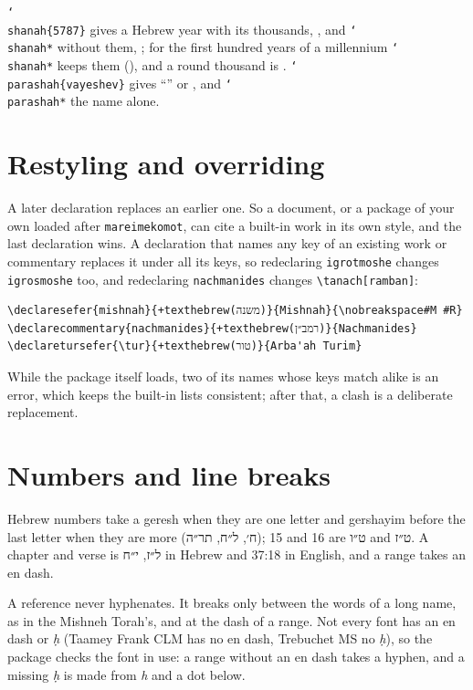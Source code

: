 \documentclass[11pt]{article}
\newcommand{\cs}[1]{\texttt{\char`\\#1}}
\begin{document}
\cs{shanah}\verb|{5787}| gives a Hebrew year with its thousands, \texthebrew{}, and
\cs{shanah*} without them, \texthebrew{}; for the first hundred years of a
millennium \cs{shanah*} keeps them (\texthebrew{}), and a round thousand is
\texthebrew{}. \cs{parashah}\verb|{vayeshev}| gives ``'' or
\texthebrew{}, and \cs{parashah*} the name alone.

\section{Restyling and overriding}

A later declaration replaces an earlier one. So a document, or a package of your own loaded
after \texttt{mareimekomot}, can cite a built-in work in its own style, and the last
declaration wins. A declaration that names any key of an existing work or commentary replaces
it under all its keys, so redeclaring \texttt{igrotmoshe} changes \texttt{igrosmoshe} too, and
redeclaring \texttt{nachmanides} changes \verb|\tanach[ramban]|:
\begin{Verbatim}[commandchars=+\(\)]
% "Mishnah Sukkah 4:1" rather than "M. Sukkah 4:1"
\declaresefer{mishnah}{+texthebrew(משנה)}{Mishnah}{\nobreakspace#M #R}
\declarecommentary{nachmanides}{+texthebrew(רמב״ן)}{Nachmanides}
\declaretursefer{\tur}{+texthebrew(טור)}{Arba'ah Turim}
\end{Verbatim}
While the package itself loads, two of its names whose keys match alike is an error, which
keeps the built-in lists consistent; after that, a clash is a deliberate replacement.

\section{Numbers and line breaks}

Hebrew numbers take a geresh when they are one letter and gershayim before the last letter
when they are more (\texthebrew{ח׳, ל״ח, תר״ה}); 15 and 16 are \texthebrew{ט״ו} and
\texthebrew{ט״ז}. A chapter and verse is \texthebrew{ל״ז, י״ח} in Hebrew and 37:18 in
English, and a range takes an en dash.

A reference never hyphenates. It breaks only between the words of a long name, as in the
Mishneh Torah's, and at the dash of a range. Not every font has an en dash or \textit{ḥ}
(Taamey Frank CLM has no en dash, Trebuchet MS no \textit{ḥ}), so the package checks the font
in use: a range without an en dash takes a hyphen, and a missing \textit{ḥ} is made from
\textit{h} and a dot below.
\end{document}
